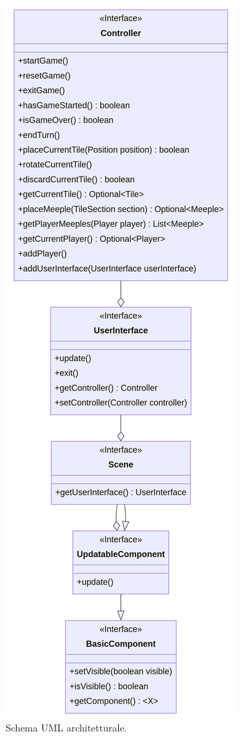 \begin{figure}[hb]
    \centering\includegraphics[scale=0.29]{images/design_uml.png}
    \caption{Schema UML architetturale.}
\end{figure}
\clearpage

